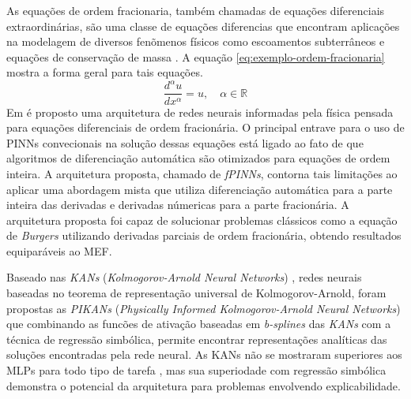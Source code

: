 As equações de ordem fracionaria, também chamadas de equações diferenciais 
extraordinárias, são uma classe de equações diferencias que encontram aplicações 
na modelagem de diversos fenõmenos físicos como escoamentos subterrâneos 
\cite{atangana-2013-fluxo-ordem-fracionaria} e equações de conservação de massa
\cite{wheatcraft-2008-conservacao-de-massa-fracionaria}. 
A equação \ref{eq:exemplo-ordem-fracionaria} mostra a forma geral para tais equações.
\begin{equation}\label{eq:exemplo-ordem-fracionaria}
    \dfrac{d^{\alpha}u}{dx^{\alpha}} = u, \quad \alpha \in \mathbb{R}
\end{equation}
Em \cite{pang-etal:2019-fPINNs} é proposto uma arquitetura de redes neurais 
informadas pela física pensada para equações diferenciais de ordem fracionária.
O principal entrave para o uso de PINNs convecionais na solução dessas equações
está ligado ao fato de que algoritmos de diferenciação automática são otimizados
para equações de ordem inteira.
A arquitetura proposta, chamado de \textit{fPINNs}, contorna tais limitações ao
aplicar uma abordagem mista que utiliza diferenciação automática para a parte inteira
das derivadas e derivadas númericas para a parte fracionária.
A arquitetura proposta foi capaz de solucionar problemas clássicos como a equação de 
\textit{Burgers} utilizando derivadas parciais de ordem fracionária, obtendo
resultados equiparáveis ao MEF.


Baseado nas \textit{KANs} (\textit{Kolmogorov-Arnold Neural Networks})
\cite{liu-etal:2025-kans}, redes neurais baseadas no teorema de representação 
universal de Kolmogorov-Arnold, foram propostas as \textit{PIKANs} 
(\textit{Physically Informed Kolmogorov-Arnold Neural Networks})
que combinando as funcões de ativação baseadas em \textit{b-splines} das
\textit{KANs} com a técnica de regressão simbólica, permite encontrar  
representações analíticas das soluções encontradas pela rede neural.
As KANs não se mostraram superiores aos MLPs para todo tipo de tarefa 
\cite{toscano:2025-pinns-para-pikans}, mas sua superiodade com regressão simbólica
demonstra o potencial da arquitetura para problemas envolvendo explicabilidade.

